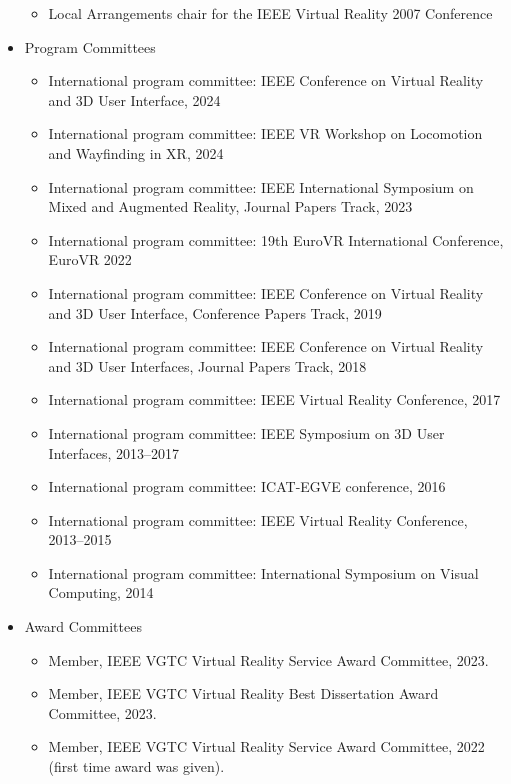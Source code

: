 \documentclass[wideaddress]{vitae}
\begin{document}
\begin{itemize}
\begin{itemize}
			\item{Local Arrangements chair for the IEEE Virtual Reality 2007 Conference}
		\end{itemize}
	\item{Program Committees}
		\begin{itemize}
			\item{International program committee: IEEE Conference on Virtual Reality and 3D User Interface, 2024}
                \item{International program committee: IEEE VR Workshop on Locomotion and Wayfinding in XR, 2024}
                \item{International program committee: IEEE International Symposium on Mixed and Augmented Reality, Journal Papers Track, 2023}
			\item{International program committee: 19th EuroVR International Conference, EuroVR 2022}
			\item{International program committee: IEEE Conference on Virtual Reality and 3D User Interface, Conference Papers Track, 2019}
			\item{International program committee: IEEE Conference on Virtual Reality and 3D User Interfaces, Journal Papers Track, 2018}
			\item{International program committee: IEEE Virtual Reality Conference, 2017}
			\item{International program committee: IEEE Symposium on 3D User Interfaces, 2013--2017}
			\item{International program committee: ICAT-EGVE conference, 2016}
			\item{International program committee: IEEE Virtual Reality Conference, 2013--2015}
			\item{International program committee: International Symposium on Visual Computing, 2014}
		\end{itemize}
    \item Award Committees
        \begin{itemize}
            \item Member, IEEE VGTC Virtual Reality Service Award Committee, 2023.
            \item Member, IEEE VGTC Virtual Reality Best Dissertation Award Committee, 2023.
            \item Member, IEEE VGTC Virtual Reality Service Award Committee, 2022 (first time award was given).
        \end{itemize}
            

\end{itemize}
\end{document}
